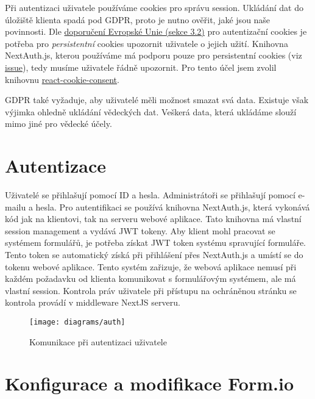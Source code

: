 Při autentizaci uživatele používáme cookies pro správu session.
Ukládání dat do úložiště klienta spadá pod GDPR, proto je nutno ověřit, jaké jsou naše povinnosti.
Dle \href{https://ec.europa.eu/justice/article-29/documentation/opinion-recommendation/files/2012/wp194_en.pdf}{doporučení Evropské Unie (sekce 3.2)} pro autentizační cookies je potřeba pro \emph{persistentní} cookies upozornit uživatele o jejich užití.
Knihovna NextAuth.js, kterou používáme má podporu pouze pro persistentní cookies (viz \href{https://github.com/nextauthjs/next-auth/issues/2534}{issue}), tedy musíme uživatele řádně upozornit.
Pro tento účel jsem zvolil knihovnu \href{https://www.npmjs.com/package/react-cookie-consent}{react-cookie-consent}.

GDPR také vyžaduje, aby uživatelé měli možnost smazat svá data.
Existuje však výjimka ohledně ukládání vědeckých dat.
Veškerá data, která ukládáme slouží mimo jiné pro vědecké účely.


\section{Autentizace}\label{sec:auth}

Uživatelé se přihlašují pomocí ID a hesla.
Administrátoři se přihlašují pomocí e-mailu a hesla.
Pro autentifikaci se používá knihovna NextAuth.js, která vykonává kód jak na klientovi, tak na serveru webové aplikace.
Tato knihovna má vlastní session management a vydává JWT tokeny.
Aby klient mohl pracovat se systémem formulářů, je potřeba získat JWT token systému spravující formuláře.
Tento token se automatický získá při přihlášení přes NextAuth.js a umístí se do tokenu webové aplikace.
Tento systém zařizuje, že webová aplikace nemusí při každém požadavku od klienta komunikovat s formulářovým systémem, ale má vlastní session.
Kontrola práv uživatele při přístupu na ochráněnou stránku se kontrola provádí v middleware NextJS serveru.

\begin{figure}[H]
    \texttt{[image: diagrams/auth]}
    \caption{Komunikace při autentizaci uživatele}\label{fig:auth}
\end{figure}


\section{Konfigurace a modifikace Form.io}\label{sec:konfigurace-a-modifikace-form.io}

